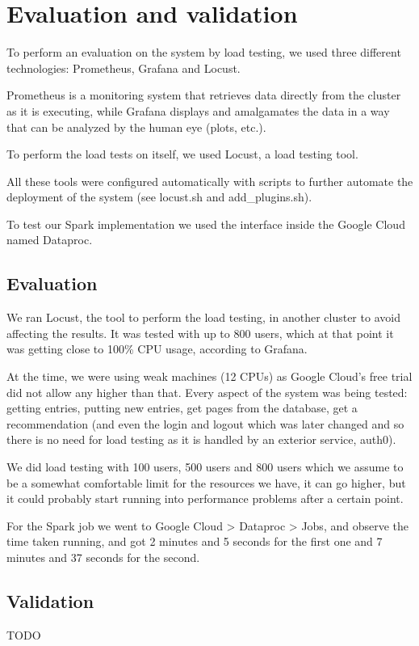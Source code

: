\documentclass[oneside]{article}
\newcommand*\fpar{\hspace{1ex}}
\begin{document}
\section{Evaluation and validation}
\label{sec:evaluation_and_validation}
\fpar To perform an evaluation on the system by load testing, we used three different technologies: Prometheus, Grafana and Locust. 
\par Prometheus is a monitoring system that retrieves data directly from the cluster as it is executing, while Grafana displays and amalgamates the data in a way that can be analyzed by the human eye (plots, etc.). 
\par To perform the load tests on itself, we used Locust, a load testing tool. 
\par All these tools were configured automatically with scripts to further automate the deployment of the system (see locust.sh and add\_plugins.sh).
\par To test our Spark implementation we used the interface inside the Google Cloud named Dataproc.

  \subsection{Evaluation}
  \label{sec:evaluation}
  \fpar We ran Locust, the tool to perform the load testing, in another cluster to avoid affecting the results. It was tested with up to 800 users, which at that point it was getting close to 100\% CPU usage, according to Grafana. 
  \par At the time, we were using weak machines (12 CPUs) as Google Cloud's free trial did not allow any higher than that. Every aspect of the system was being tested: getting entries, putting new entries, get pages from the database, get a recommendation (and even the login and logout which was later changed and so there is no need for load testing as it is handled by an exterior service, auth0). 
  \par We did load testing with 100 users, 500 users and 800 users which we assume to be a somewhat comfortable limit for the resources we have, it can go higher, but it could probably start running into performance problems after a certain point.
  \par For the Spark job we went to Google Cloud > Dataproc > Jobs, and observe the time taken running, and got 2 minutes and 5 seconds for the first one and 7 minutes and 37 seconds for the second.

  \subsection{Validation}
  \label{sec:validation}
  \fpar TODO
\end{document}
